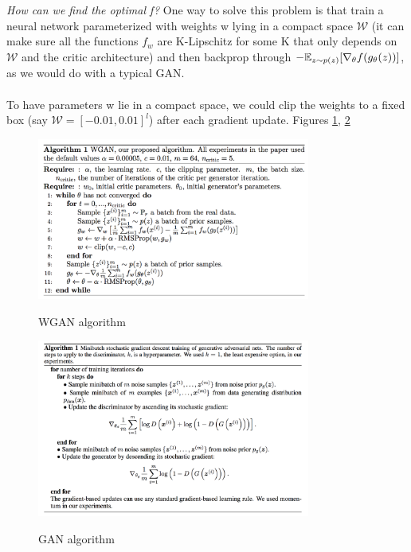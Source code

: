 \documentclass[english]{article}
\begin{document}
\item {\emph{How can we find the optimal f?}}
One way to solve this problem is that train a neural network parameterized with weights w lying in a compact space $\mathcal{W}$ (it can make sure all the functions $f_w$ are K-Lipschitz for some K that only depends on  $\mathcal{W}$ and the critic architecture) and then backprop through $-\mathbb{E}_{z\sim p(z)}[\nabla_\theta f(g_\theta(z))]$, as we would do with a typical GAN.\\
~\\
To have parameters w lie in a compact space, we could clip the weights to a fixed box (say $\mathcal{W}=[-0.01,0.01]^l$) after each gradient update. Figures \ref{wgan}, \ref{gan_alg}




 
\begin{figure}[h!]
  \caption{WGAN algorithm}
  \centering
  \includegraphics[width=0.8\textwidth]{WGAN_algorithm.png}
  \label{wgan}
\end{figure}




\begin{figure}[h!]
  \caption{GAN algorithm}
  \centering
  \includegraphics[width=0.8\textwidth]{GAN_algorithm.png}
    \label{gan_alg}
\end{figure}
\end{document}
